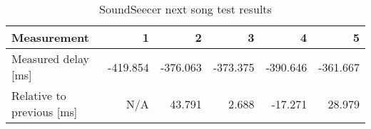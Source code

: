 \begin{table}[h]
\centering
\begin{tabular}{|l|r|r|r|r|r|}
\hline
Measurement          		& 1       	& 2       	& 3       & 4       & 5       \\ \hline
Measured delay [ms]       	& -419.854 	& -376.063 	& -373.375 & -390.646 & -361.667 \\ \hline
Relative to previous [ms] 	& N/A     	& 43.791 	& 2.688  & -17.271  & 28.979  \\ \hline
\end{tabular}
\caption{SoundSeecer next song test results}
\label{fig:soundseedernextsongfigure}
\end{table}
